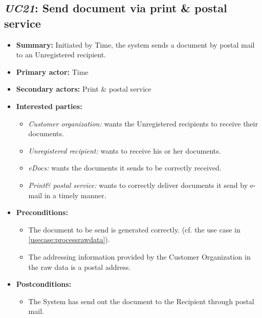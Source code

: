 \documentclass[a4paper,10pt]{article}
\begin{document}
\subsection{\emph{UC21}: Send document via print \& postal service}
\begin{itemize}
    \item \textbf{Summary:} Initiated by Time, the system sends a document by postal mail to an Unregistered recipient.
    \item \textbf{Primary actor:} Time
	\item \textbf{Secondary actors:} Print \& postal service
    \item \textbf{Interested parties:} 
        \begin{itemize}
            \item \textit{Customer organization:} wants the Unregistered recipients to receive their documents.
            \item \textit{Unregistered recipient:} wants to receive his or her documents.
            \item \textit{eDocs:} wants the documents it sends to be correctly received.
            \item \textit{Print\& postal service:} wants to correctly deliver documents it send by e-mail in a timely manner.
        \end{itemize}

    \item \textbf{Preconditions:}
        \begin{itemize}
            \item The document to be send is generated correctly. (cf. the use case in \ref{usecase:processrawdata}).
            \item The addressing information provided by the Customer Organization in the raw data is a postal address.
        \end{itemize}

    \item \textbf{Postconditions:}
        \begin{itemize}
            \item The System has send out the document to the Recipient through postal mail.
        \end{itemize}
        

\end{itemize}
\end{document}
